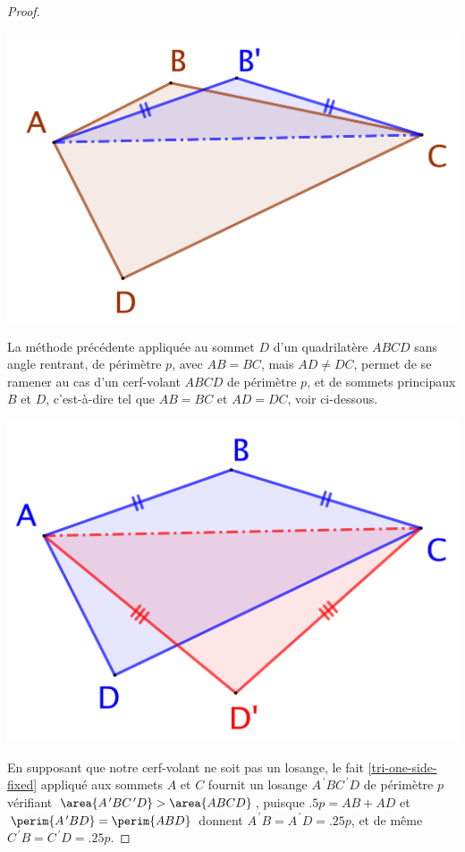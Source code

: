 \begin{proof}
    \begin{center}
        \includegraphics[scale=.4]{convex-gene.png}
    \end{center}


    La méthode précédente appliquée au sommet $D$ d'un quadrilatère $ABCD$ sans angle rentrant, de périmètre $p$, avec $AB = BC$, mais $AD \neq DC$, permet de se ramener au cas d'un cerf-volant $ABCD$ de périmètre $p$, et de sommets principaux $B$ et $D$, c'est-à-dire tel que $AB = BC$ et $AD = DC$, voir ci-dessous.

    \begin{center}
        \includegraphics[scale=.4]{convex-one-paire.png}
    \end{center}


    En supposant que notre cerf-volant ne soit pas un losange, le fait \ref{tri-one-side-fixed} appliqué aux sommets $A$ et $C$ fournit un losange $A^{\,\prime}BC^{\,\prime}D$ de périmètre $p$ vérifiant $\area{A^{\,\prime}BC^{\,\prime}D} > \area{ABCD}$,
    puisque
    $\num{.5} p = AB + AD$
    et
    $\perim{A^{\,\prime}BD} = \perim{ABD}$
    donnent
    $A^{\,\prime}B = A^{\,\prime}D = \num{.25} p$,
    et de même
    $C^{\,\prime}B = C^{\,\prime}D = \num{.25} p$.


\end{proof}
